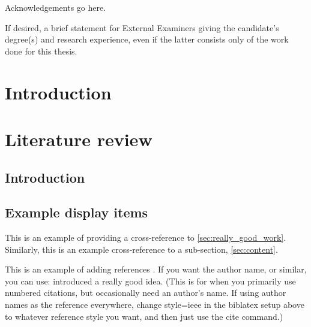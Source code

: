 \begin{uomacknowledgements} %
Acknowledgements go here.
\end{uomacknowledgements}



\begin{uomauthor} %
If desired, a brief statement for External Examiners giving the candidate’s degree(s) and research experience, even if the latter consists only of the work done for this thesis.
\end{uomauthor} 


\uomstartmainbody %


\chapter{Introduction} %
  
  \lipsum[1-5] %



\chapter{Literature review}

  \section{Introduction}
    \lipsum[1] 
  
  \section{Example display items}
    This is an example of providing a cross-reference to \autoref{sec:really_good_work}. Similarly, this is an example cross-reference to a sub-section, \autoref{sec:content}.
    
    This is an example of adding references \cite{ref:jCAS09,ref:jCAS09a,ref:jCAS10}. If you want the author name, or similar, you can use: \citeauthor*{ref:jCAS09} \citeyear{ref:jCAS09} introduced a really good idea. (This is for when you primarily use numbered citations, but occasionally need an author's name. If using author names as the reference everywhere, change style=ieee in the biblatex setup above to whatever reference style you want, and then just use the cite command.)

